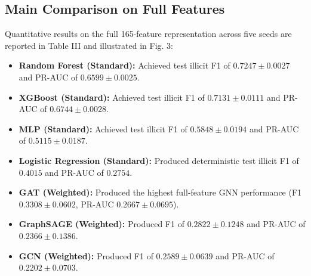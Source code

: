 \documentclass[conference]{IEEEtran}
\begin{document}
\subsection{Main Comparison on Full Features}
Quantitative results on the full 165-feature representation across five seeds are reported in Table III and illustrated in Fig. 3:
\begin{itemize}
    \item \textbf{Random Forest (Standard):} Achieved test illicit F1 of $0.7247 \pm 0.0027$ and PR-AUC of $0.6599 \pm 0.0025$.
    \item \textbf{XGBoost (Standard):} Achieved test illicit F1 of $0.7131 \pm 0.0111$ and PR-AUC of $0.6744 \pm 0.0028$.
    \item \textbf{MLP (Standard):} Achieved test illicit F1 of $0.5848 \pm 0.0194$ and PR-AUC of $0.5115 \pm 0.0187$.
    \item \textbf{Logistic Regression (Standard):} Produced deterministic test illicit F1 of $0.4015$ and PR-AUC of $0.2754$.
    \item \textbf{GAT (Weighted):} Produced the highest full-feature GNN performance (F1 $0.3308 \pm 0.0602$, PR-AUC $0.2667 \pm 0.0695$).
    \item \textbf{GraphSAGE (Weighted):} Produced F1 of $0.2822 \pm 0.1248$ and PR-AUC of $0.2366 \pm 0.1386$.
    \item \textbf{GCN (Weighted):} Produced F1 of $0.2589 \pm 0.0639$ and PR-AUC of $0.2202 \pm 0.0703$.
\end{itemize}
\end{document}
